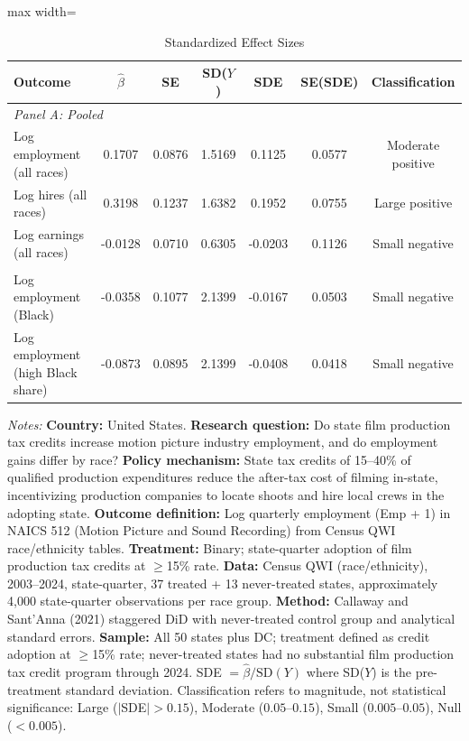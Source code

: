 \begin{table}[H]
\centering
\caption{Standardized Effect Sizes}
\label{tab:sde}
\begin{threeparttable}
\begin{adjustbox}{max width=\textwidth}
\begin{tabular}{lcccccc}
\toprule
Outcome & $\hat{\beta}$ & SE & SD($Y$) & SDE & SE(SDE) & Classification \\
\midrule
\multicolumn{7}{l}{\textit{Panel A: Pooled}} \\
Log employment (all races) & 0.1707 & 0.0876 & 1.5169 & 0.1125 & 0.0577 & Moderate positive \\
Log hires (all races) & 0.3198 & 0.1237 & 1.6382 & 0.1952 & 0.0755 & Large positive \\
Log earnings (all races) & -0.0128 & 0.0710 & 0.6305 & -0.0203 & 0.1126 & Small negative \\
\addlinespace
\multicolumn{7}{l}{\textit{Panel B: Heterogeneous}} \\
Log employment (Black) & -0.0358 & 0.1077 & 2.1399 & -0.0167 & 0.0503 & Small negative \\
Log employment (high Black share) & -0.0873 & 0.0895 & 2.1399 & -0.0408 & 0.0418 & Small negative \\
\bottomrule
\end{tabular}
\end{adjustbox}
\end{threeparttable}
\vspace{0.3em}
\begin{minipage}{\textwidth}\footnotesize
\textit{Notes:} \textbf{Country:} United States. \textbf{Research question:} Do state film production tax credits increase motion picture industry employment, and do employment gains differ by race? \textbf{Policy mechanism:} State tax credits of 15--40\% of qualified production expenditures reduce the after-tax cost of filming in-state, incentivizing production companies to locate shoots and hire local crews in the adopting state. \textbf{Outcome definition:} Log quarterly employment (Emp + 1) in NAICS 512 (Motion Picture and Sound Recording) from Census QWI race/ethnicity tables. \textbf{Treatment:} Binary; state-quarter adoption of film production tax credits at $\geq$15\% rate. \textbf{Data:} Census QWI (race/ethnicity), 2003--2024, state-quarter, 37 treated + 13 never-treated states, approximately 4,000 state-quarter observations per race group. \textbf{Method:} Callaway and Sant'Anna (2021) staggered DiD with never-treated control group and analytical standard errors. \textbf{Sample:} All 50 states plus DC; treatment defined as credit adoption at $\geq$15\% rate; never-treated states had no substantial film production tax credit program through 2024. SDE $= \hat{\beta} / \text{SD}(Y)$ where SD($Y$) is the pre-treatment standard deviation. Classification refers to magnitude, not statistical significance: Large ($|$SDE$| > 0.15$), Moderate ($0.05$--$0.15$), Small ($0.005$--$0.05$), Null ($< 0.005$).
\end{minipage}
\end{table}

